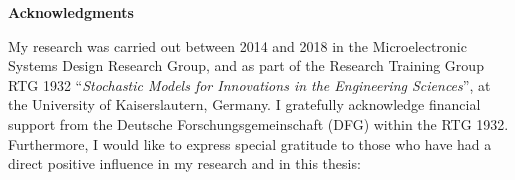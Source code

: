 
\thispagestyle{empty}


\begin{center}
  \textbf{Acknowledgments}
\end{center}



My research was carried out between 2014 and 2018 in the Microelectronic Systems Design Research Group, and as part of the Research Training Group RTG 1932 ``\textit{Stochastic Models for Innovations in the Engineering Sciences}'', 
at the University of Kaiserslautern, Germany. 
I gratefully acknowledge financial support from the Deutsche Forschungsgemeinschaft (DFG) within the RTG 1932.
Furthermore,  I would like to express special gratitude to those who have had a direct positive influence in my research and in this thesis:
  


%

